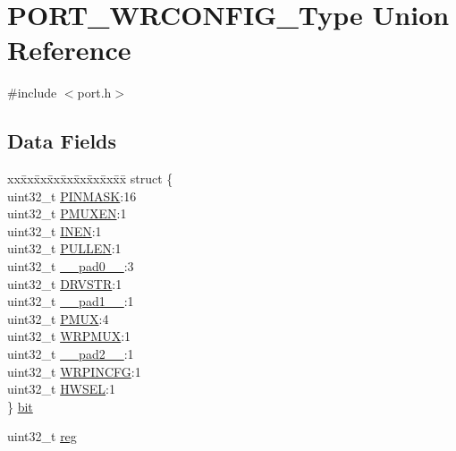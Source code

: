 \hypertarget{union_p_o_r_t___w_r_c_o_n_f_i_g___type}{}\section{P\+O\+R\+T\+\_\+\+W\+R\+C\+O\+N\+F\+I\+G\+\_\+\+Type Union Reference}
\label{union_p_o_r_t___w_r_c_o_n_f_i_g___type}


{\ttfamily \#include $<$port.\+h$>$}

\subsection*{Data Fields}
\begin{DoxyCompactItemize}
\item 
\begin{tabbing}
xx\=xx\=xx\=xx\=xx\=xx\=xx\=xx\=xx\=\kill
struct \{\\
\>uint32\_t \mbox{\hyperlink{union_p_o_r_t___w_r_c_o_n_f_i_g___type_acf876a6b0a4ceb32b439841a8bd8ff29}{PINMASK}}:16\\
\>uint32\_t \mbox{\hyperlink{union_p_o_r_t___w_r_c_o_n_f_i_g___type_a8c649b1ea9b173be8b6fe9e51734daa4}{PMUXEN}}:1\\
\>uint32\_t \mbox{\hyperlink{union_p_o_r_t___w_r_c_o_n_f_i_g___type_a3516b2f8e268452b7fddc9107add8557}{INEN}}:1\\
\>uint32\_t \mbox{\hyperlink{union_p_o_r_t___w_r_c_o_n_f_i_g___type_a59fe7ef5d3f01c8e1e3962995fbfb079}{PULLEN}}:1\\
\>uint32\_t \mbox{\hyperlink{union_p_o_r_t___w_r_c_o_n_f_i_g___type_a3e57c2ef1c3ffb36722f000cc1156824}{\_\_pad0\_\_}}:3\\
\>uint32\_t \mbox{\hyperlink{union_p_o_r_t___w_r_c_o_n_f_i_g___type_a8664896730daa312c026941e254520ab}{DRVSTR}}:1\\
\>uint32\_t \mbox{\hyperlink{union_p_o_r_t___w_r_c_o_n_f_i_g___type_a6712ba6dd1d5b43d2d56ff8ac4e275a7}{\_\_pad1\_\_}}:1\\
\>uint32\_t \mbox{\hyperlink{union_p_o_r_t___w_r_c_o_n_f_i_g___type_ab7769f135b4211c9d60d712906de29ef}{PMUX}}:4\\
\>uint32\_t \mbox{\hyperlink{union_p_o_r_t___w_r_c_o_n_f_i_g___type_add0323fb7417989d39b1c4b3663432e3}{WRPMUX}}:1\\
\>uint32\_t \mbox{\hyperlink{union_p_o_r_t___w_r_c_o_n_f_i_g___type_a9ce12a63de64ef64ae2d59d128251cae}{\_\_pad2\_\_}}:1\\
\>uint32\_t \mbox{\hyperlink{union_p_o_r_t___w_r_c_o_n_f_i_g___type_a144bb2f9270e88855d1b2ea3eba00aa2}{WRPINCFG}}:1\\
\>uint32\_t \mbox{\hyperlink{union_p_o_r_t___w_r_c_o_n_f_i_g___type_af3b0d2b6ba6cb9b0f48b6d83bfa6e98c}{HWSEL}}:1\\
\} \mbox{\hyperlink{union_p_o_r_t___w_r_c_o_n_f_i_g___type_a9212d360693ea3849e08c2b8590c2237}{bit}}\\

\end{tabbing}\item 
uint32\+\_\+t \mbox{\hyperlink{union_p_o_r_t___w_r_c_o_n_f_i_g___type_a6b91636401516a477989a336376d7b40}{reg}}
\end{DoxyCompactItemize}


